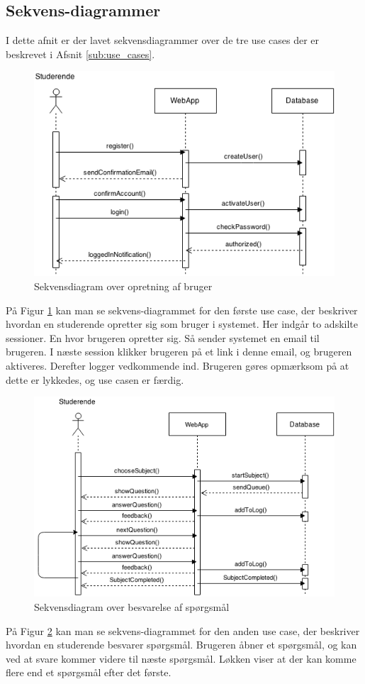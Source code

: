 \documentclass[11pt, a4paper]{article}
\begin{document}
\subsection{Sekvens-diagrammer}
I dette afnit er der lavet sekvensdiagrammer over de tre use cases der er beskrevet i Afsnit \ref{sub:use_cases}.
\begin{figure}[h]
    \centering
    \includegraphics[width=0.8\linewidth]{figures/OpretBrugerUseCase.png}
    \caption{Sekvensdiagram over opretning af bruger}
    \label{fig:opret_bruger_sekvens}
\end{figure}
På Figur \ref{fig:opret_bruger_sekvens} kan man se sekvens-diagrammet for den første use case, der beskriver hvordan en studerende opretter sig som bruger i systemet. Her indgår to adskilte sessioner. En hvor brugeren opretter sig. Så sender systemet en email til brugeren. I næste session klikker brugeren på et link i denne email, og brugeren aktiveres. Derefter logger vedkommende ind. Brugeren gøres opmærksom på at dette er lykkedes, og use casen er færdig.

\begin{figure}[h]
    \centering
    \includegraphics[width=0.8\linewidth]{figures/SvarUseCase.png}
    \caption{Sekvensdiagram over besvarelse af spørgsmål}
    \label{fig:svar_sekvens}
\end{figure}
På Figur \ref{fig:svar_sekvens} kan man se sekvens-diagrammet for den anden use case, der beskriver hvordan en studerende besvarer spørgsmål. Brugeren åbner et spørgsmål, og kan ved at svare kommer videre til næste spørgsmål. Løkken viser at der kan komme flere end et spørgsmål efter det første.
\end{document}
